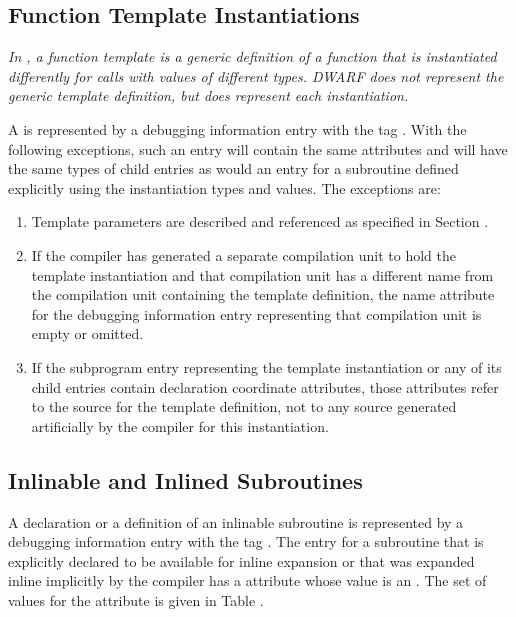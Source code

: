 \subsection{Function Template Instantiations}
\label{chap:functiontemplateinstantiations}

\textit{In , a function template is a generic definition of
a function that is instantiated differently for calls with
values of different types. DWARF does not represent the generic
template definition, but does represent each instantiation.}

A  
is represented by a debugging information entry with the 
tag \DWTAGsubprogram. 
With the following
exceptions, such an entry will contain the same attributes and
will have the same types of child entries as would an entry
for a subroutine defined explicitly using the instantiation
types and values. The exceptions are:

\begin{enumerate}[1. ]
\item Template parameters are described and referenced as specified in
Section .

\item If the compiler has generated a separate compilation unit
to hold the template instantiation and that compilation unit
has a different name from the compilation unit containing
the template definition, the name attribute for the debugging
information entry representing that compilation unit is empty
or omitted.

\item If the subprogram entry representing the template
instantiation or any of its child entries contain declaration
coordinate attributes, those attributes refer to the source
for the template definition, not to any source generated
artificially by the compiler for this instantiation.
\end{enumerate}


\subsection{Inlinable and Inlined Subroutines}
\label{chap:inlinedsubroutines}
A declaration or a definition of an inlinable subroutine
is represented by a debugging information entry with the
tag \DWTAGsubprogram.
The entry for a subroutine 
that is\hypertarget{chap:DWATinlineinlinedsubroutine}{}
explicitly declared to be available for inline expansion or
that was expanded inline implicitly by the compiler has a
\DWATinlineDEFN{} attribute whose value is an 
. The
set of values for the \DWATinline{} attribute is given in
Table .

